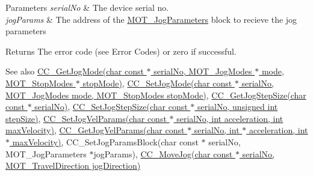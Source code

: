 \begin{DoxyParams}{Parameters}
{\em serial\+No} & The device serial no. \\
\hline
{\em jog\+Params} & The address of the \hyperlink{struct_m_o_t___jog_parameters}{M\+O\+T\+\_\+\+Jog\+Parameters} block to recieve the jog parameters \\
\hline
\end{DoxyParams}
\begin{DoxyReturn}{Returns}
The error code (see Error Codes) or zero if successful. 
\end{DoxyReturn}
\begin{DoxySeeAlso}{See also}
\hyperlink{group___k_cube_motorised_gripper_gad0854b1ff5f4f234180a5b121deba1a5}{C\+C\+\_\+\+Get\+Jog\+Mode(char const $\ast$ serial\+No, M\+O\+T\+\_\+\+Jog\+Modes $\ast$ mode, M\+O\+T\+\_\+\+Stop\+Modes $\ast$ stop\+Mode)}, \hyperlink{group___k_cube_motorised_gripper_gade52d60961e1236833ff28b57298e965}{C\+C\+\_\+\+Set\+Jog\+Mode(char const $\ast$ serial\+No, M\+O\+T\+\_\+\+Jog\+Modes mode, M\+O\+T\+\_\+\+Stop\+Modes stop\+Mode)}, \hyperlink{group___k_cube_motorised_gripper_gabc6f2331e5a9c4e49548a6b9ad810bea}{C\+C\+\_\+\+Get\+Jog\+Step\+Size(char const $\ast$ serial\+No)}, \hyperlink{group___k_cube_motorised_gripper_ga39d7bbe3a44363bf3f90638f8774abc5}{C\+C\+\_\+\+Set\+Jog\+Step\+Size(char const $\ast$ serial\+No, unsigned int step\+Size)}, \hyperlink{group___k_cube_motorised_gripper_ga055a75c8f0532a131e82fec7fd901e2f}{C\+C\+\_\+\+Set\+Jog\+Vel\+Params(char const $\ast$ serial\+No, int acceleration, int max\+Velocity)}, \hyperlink{group___k_cube_motorised_gripper_gaf4e074bc5c1ab001a2f0d14b3cbc1346}{C\+C\+\_\+\+Get\+Jog\+Vel\+Params(char const $\ast$ serial\+No, int $\ast$ acceleration, int $\ast$ max\+Velocity)}, C\+C\+\_\+\+Set\+Jog\+Params\+Block(char const $\ast$ serial\+No, M\+O\+T\+\_\+\+Jog\+Parameters $\ast$jog\+Params), \hyperlink{group___k_cube_motorised_gripper_ga6e9e7f1ee93e2fe5b23a1abc0270e8c7}{C\+C\+\_\+\+Move\+Jog(char const $\ast$ serial\+No, M\+O\+T\+\_\+\+Travel\+Direction jog\+Direction)}


\end{DoxySeeAlso}

\begin{DoxyCodeInclude}
\end{DoxyCodeInclude}
